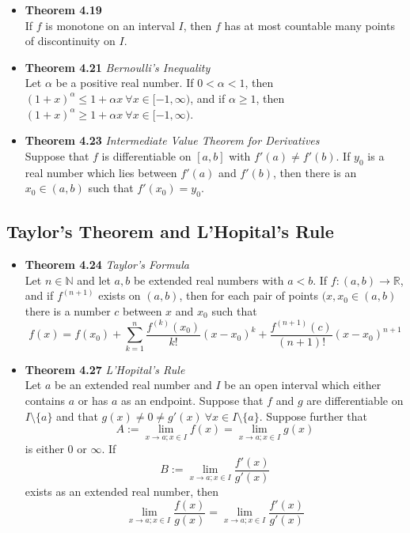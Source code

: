 \documentclass[11pt,a4paper]{article}
\begin{document}
\begin{itemize}
    \item \textbf{Theorem 4.19} \\
        If $f$ is monotone on an interval $I$, then $f$ has at most countable many points
        of discontinuity on $I$.

    \item \textbf{Theorem 4.21} \emph{Bernoulli's Inequality} \\
        Let $\alpha$ be a positive real number.
        If $0 < \alpha < 1$, then
        ${(1+x)}^\alpha \leq 1 + \alpha x \ \forall x \in [-1, \infty)$,
        and if $\alpha \geq 1$, then
        ${(1+x)}^\alpha \geq 1 + \alpha x \ \forall x \in [-1, \infty)$.

    \item \textbf{Theorem 4.23} \emph{Intermediate Value Theorem for Derivatives} \\
        Suppose that $f$ is differentiable on $[a, b]$ with $f'(a) \neq f'(b)$.
        If $y_0$ is a real number which lies between $f'(a)$ and $f'(b)$,
        then there is an $x_0 \in (a, b)$ such that $f'(x_0) = y_0$.
\end{itemize}

\subsection{Taylor's Theorem and L'Hopital's Rule}

\begin{itemize}

    \item \textbf{Theorem 4.24} \emph{Taylor's Formula} \\
        Let $n \in \mathbb{N}$ and let $a, b$ be extended real numbers with $a<b$.
        If $f : (a, b) \to \mathbb{R}$, and if $f^{(n+1)}$ exists on $(a, b)$,
        then for each pair of points $(x, x_0 \in (a, b)$ there is a number $c$
        between $x$ and $x_0$ such that
        \[
            f(x) = f(x_0) + \sum_{k=1}^n \frac{f^{(k)} (x_0)}{k!}(x-x_0)^k +
            \frac{f^{(n+1)}(c)}{(n+1)!} (x-x_0)^{n+1}
        \]

    \item \textbf{Theorem 4.27} \emph{L'Hopital's Rule} \\
        Let $a$ be an extended real number and $I$ be an open interval which either contains
        $a$ or has $a$ as an endpoint.
        Suppose that $f$ and $g$ are differentiable on $I \setminus \{a\}$ and that
        $g(x) \neq 0 \neq g'(x) \ \forall x \in I \setminus \{a\}$.
        Suppose further that
        \[
            A := \lim_{x \to a; x \in I} f(x) = \lim_{x \to a; x \in I} g(x)
        \]
        is either $0$ or $\infty$.
        If
        \[
            B := \lim_{x \to a; x \in I} \frac{f'(x)}{g'(x)}
        \]
        exists as an extended real number, then
        \[
            \lim_{x \to a; x \in I} \frac{f(x)}{g(x)} =
            \lim_{x \to a; x \in I} \frac{f'(x)}{g'(x)}
        \]

\end{itemize}
\end{document}
